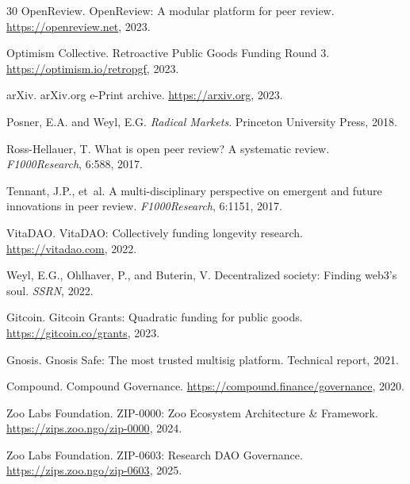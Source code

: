 \documentclass[11pt,letterpaper]{article}
\begin{document}
\begin{thebibliography}{30}
OpenReview.
\newblock OpenReview: A modular platform for peer review.
\newblock \url{https://openreview.net}, 2023.

Optimism Collective.
\newblock Retroactive Public Goods Funding Round 3.
\newblock \url{https://optimism.io/retropgf}, 2023.

arXiv.
\newblock arXiv.org e-Print archive.
\newblock \url{https://arxiv.org}, 2023.

Posner, E.A. and Weyl, E.G.
\newblock \emph{Radical Markets}.
\newblock Princeton University Press, 2018.

Ross-Hellauer, T.
\newblock What is open peer review? A systematic review.
\newblock \emph{F1000Research}, 6:588, 2017.

Tennant, J.P., et~al.
\newblock A multi-disciplinary perspective on emergent and future innovations in peer review.
\newblock \emph{F1000Research}, 6:1151, 2017.

VitaDAO.
\newblock VitaDAO: Collectively funding longevity research.
\newblock \url{https://vitadao.com}, 2022.

Weyl, E.G., Ohlhaver, P., and Buterin, V.
\newblock Decentralized society: Finding web3's soul.
\newblock \emph{SSRN}, 2022.

Gitcoin.
\newblock Gitcoin Grants: Quadratic funding for public goods.
\newblock \url{https://gitcoin.co/grants}, 2023.

Gnosis.
\newblock Gnosis Safe: The most trusted multisig platform.
\newblock Technical report, 2021.

Compound.
\newblock Compound Governance.
\newblock \url{https://compound.finance/governance}, 2020.

Zoo Labs Foundation.
\newblock ZIP-0000: Zoo Ecosystem Architecture \& Framework.
\newblock \url{https://zips.zoo.ngo/zip-0000}, 2024.

Zoo Labs Foundation.
\newblock ZIP-0603: Research DAO Governance.
\newblock \url{https://zips.zoo.ngo/zip-0603}, 2025.


\end{thebibliography}
\end{document}
